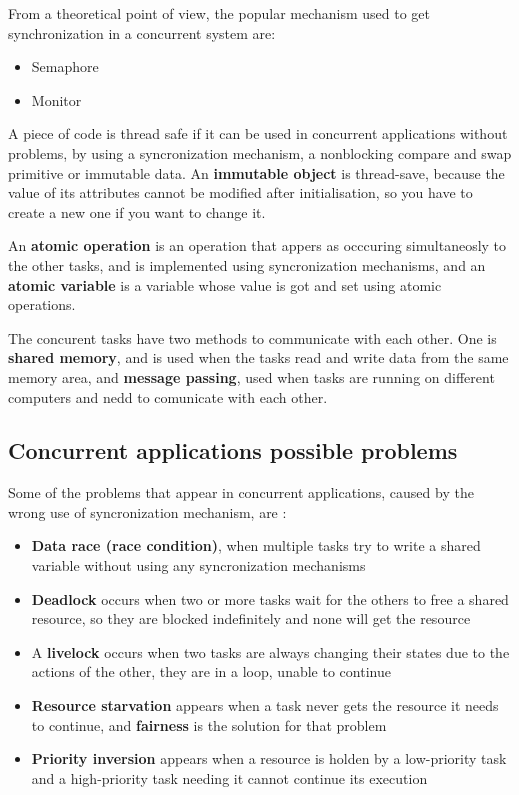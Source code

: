 From a theoretical point of view, the popular mechanism used to get synchronization in a concurrent system are:
\begin{itemize}
\item Semaphore
\item Monitor
\end{itemize}

A piece of code is thread safe if it can be used in concurrent applications without problems, by using a syncronization mechanism, a nonblocking compare and swap primitive or immutable data. An \textbf{immutable object} is thread-save, because the value of its attributes cannot be modified after initialisation, so you have to create a new one if you want to change it.

An \textbf{atomic operation} is an operation that appers as occcuring simultaneosly to the other tasks, and is implemented using syncronization mechanisms, and an \textbf{atomic variable} is a variable whose value is got and set using atomic operations.

The concurent tasks have two methods to communicate with each other. One is \textbf{shared memory}, and is used when the tasks read and write data from the same memory area, and \textbf{message passing}, used when tasks are running on different computers and nedd to comunicate with each other.

\subsection{Concurrent applications possible problems}

Some of the problems that appear in concurrent applications, caused by the wrong use of syncronization mechanism, are \cite{FernandezGonzalez}:
\begin{itemize}
\item \textbf{Data race (race condition)}, when multiple tasks try to write a shared variable without using any syncronization mechanisms
\item \textbf{Deadlock} occurs when two or more tasks wait for the others to free a shared resource, so they are blocked indefinitely and none will get the resource
\item A \textbf{livelock} occurs when two tasks are always changing their states due to the actions of the other, they are in a loop, unable to continue
\item \textbf{Resource starvation} appears when a task never gets the resource it needs to continue, and \textbf{fairness} is the solution for that problem
\item \textbf{Priority inversion} appears when a resource is holden by a low-priority task and a high-priority task needing it cannot continue its execution
\end{itemize}

